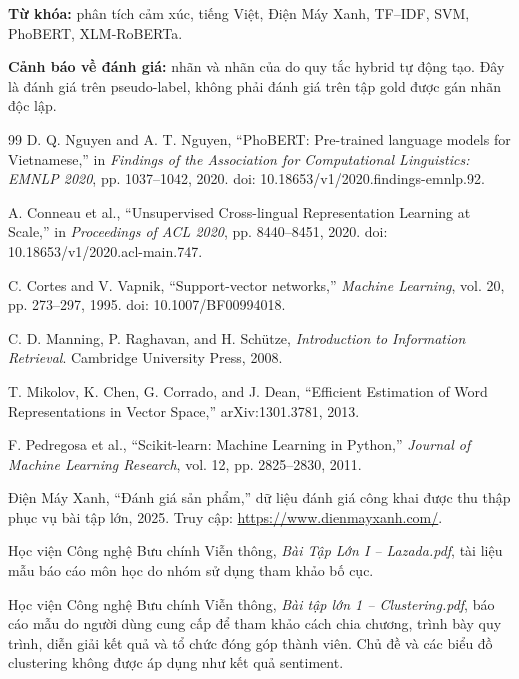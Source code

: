 \documentclass[12pt,a4paper,oneside]{report}
\newcommand{\code}[1]{\texttt{\detokenize{#1}}}
\begin{document}
\vspace{0.5em}
\noindent\textbf{Từ khóa:} phân tích cảm xúc, tiếng Việt, Điện Máy Xanh, TF--IDF, SVM, PhoBERT, XLM-RoBERTa.

\begin{center}
\colorbox{softblue}{\parbox{0.92\textwidth}{\textcolor{warnred}{\textbf{Cảnh báo về đánh giá:}} nhãn \code{label_target} và nhãn của \code{data/processed/test.csv} do quy tắc hybrid tự động tạo. Đây là đánh giá trên pseudo-label, không phải đánh giá trên tập gold được gán nhãn độc lập.}}
\end{center}

\tableofcontents
\listoffigures
\listoftables
\clearpage
{}







\begin{thebibliography}{99}
D. Q. Nguyen and A. T. Nguyen, ``PhoBERT: Pre-trained language models for Vietnamese,'' in \textit{Findings of the Association for Computational Linguistics: EMNLP 2020}, pp. 1037--1042, 2020. doi: 10.18653/v1/2020.findings-emnlp.92.

A. Conneau et al., ``Unsupervised Cross-lingual Representation Learning at Scale,'' in \textit{Proceedings of ACL 2020}, pp. 8440--8451, 2020. doi: 10.18653/v1/2020.acl-main.747.

C. Cortes and V. Vapnik, ``Support-vector networks,'' \textit{Machine Learning}, vol. 20, pp. 273--297, 1995. doi: 10.1007/BF00994018.

C. D. Manning, P. Raghavan, and H. Schütze, \textit{Introduction to Information Retrieval}. Cambridge University Press, 2008.

T. Mikolov, K. Chen, G. Corrado, and J. Dean, ``Efficient Estimation of Word Representations in Vector Space,'' arXiv:1301.3781, 2013.

F. Pedregosa et al., ``Scikit-learn: Machine Learning in Python,'' \textit{Journal of Machine Learning Research}, vol. 12, pp. 2825--2830, 2011.

Điện Máy Xanh, ``Đánh giá sản phẩm,'' dữ liệu đánh giá công khai được thu thập phục vụ bài tập lớn, 2025. Truy cập: \url{https://www.dienmayxanh.com/}.

Học viện Công nghệ Bưu chính Viễn thông, \textit{Bài Tập Lớn I -- Lazada.pdf}, tài liệu mẫu báo cáo môn học do nhóm sử dụng tham khảo bố cục.

Học viện Công nghệ Bưu chính Viễn thông, \textit{Bài tập lớn 1 -- Clustering.pdf}, báo cáo mẫu do người dùng cung cấp để tham khảo cách chia chương, trình bày quy trình, diễn giải kết quả và tổ chức đóng góp thành viên. Chủ đề và các biểu đồ clustering không được áp dụng như kết quả sentiment.
\end{thebibliography}
\end{document}

